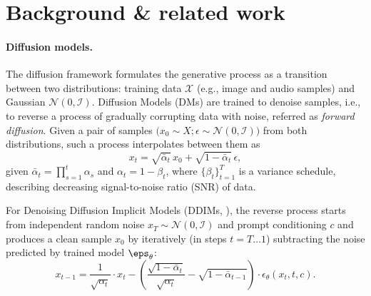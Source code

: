 \documentclass{article} %
\begin{document}
\section{Background \& related work}
\label{sec:background}

\paragraph{Diffusion models.} The diffusion framework formulates the generative process as a transition between two distributions: training data $\mathcal{X}$ (e.g., image and audio samples) and Gaussian $\mathcal{N}(0,\mathcal{I})$. 
Diffusion Models (DMs) are trained to denoise samples, i.e., to reverse a process of gradually corrupting data with noise, referred as \textit{forward diffusion}. Given a pair of samples $\big(x_0\sim X;\epsilon\sim\mathcal{N}(0,\mathcal{I})\big)$ from both distributions, such a process interpolates between them as  
\begin{equation}\label{eq:forward}
    x_t=\sqrt{\bar{\alpha}_t}\,x_0+\sqrt{1-\bar{\alpha}_t}\,\epsilon,
\end{equation} given
$\bar{\alpha}_t=\prod_{s=1}^{t}\alpha_s$ and $\alpha_t=1-\beta_t$, where $\{\beta_t\}_{t=1}^{T}$ is a variance schedule, describing decreasing signal-to-noise ratio (SNR) of data. 

For Denoising Diffusion Implicit Models (DDIMs, \citet{song2020denoising}), the reverse process starts from independent random noise $x_T\sim\mathcal{N}(0,\mathcal{I})$ and prompt conditioning $c$ and produces a clean sample $x_0$ by iteratively (in steps $t=T\dots1$) subtracting the noise predicted by trained model $\eps_\theta$:
\begin{equation}\label{eq:ddim-gen-process}
    x_{t-1} = \frac{1}{\sqrt{\alpha_{t}}}\cdot x_t - (\frac{\sqrt{1-\bar{\alpha}_t}}{\sqrt{\alpha_t}}-\sqrt{1-\bar{\alpha}_{t-1}})\cdot\epsilon_\theta(x_t,t,c).
\end{equation}
\end{document}
